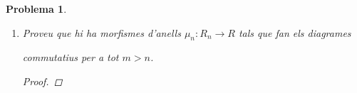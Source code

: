 \documentclass[compress]{article}
\newtheorem{problema}{Problema}
\theoremstyle{definition}
\begin{document}
\begin{problema}
\begin{enumerate}
\begin{proof}
            \begin{align*}
                &([(r,n)]+[(r',n')])\cdot[(r'',n'')]\\
                =\,
                &[(f_{nk}(r)+_{R_{k}}f_{n'k}(r'),k)]\cdot[(r'',n'')]
                &\quad&\textrm{(Per definició de $+$)}\\
                =\,
                &[((f_{kk'}(f_{nk}(r)+_{R_{k}}f_{n'k}(r')))\cdot_{R_{k'}}f_{n''k'}(r''),k')]
                &\quad&\textrm{(Per definició de $+$)}\\
                =\,
                &[((f_{nk'}(r)+_{R_{k'}}f_{n'k'}(r'))\cdot_{R_{k'}}f_{n''k'}(r''),k')]
                &\quad&\textrm{($f_{kk'}$ morf. d'anells i $f_{\alpha\gamma}=f_{\beta\gamma}\circ f_{\alpha\beta}$)}\\
                =\,
                &[((f_{nk'}(r)\cdot_{R_{k'}}f_{n''k'}(r''))+_{R_{k'}}(f_{n'k'}(r')\cdot_{R_{k'}}f_{n''k'}(r'')),k')]
                &\quad&\textrm{(Distributivitat de $\cdot_{R_{n}}$ sobre $+_{R_{n}}$)}\\
                =\,
                &[((f_{nk'}(r)\cdot_{R_{k'}}f_{n''k'}(r''),k')]
                +[((f_{n'k'}(r')\cdot_{R_{k'}}f_{n''k'}(r'')),k')]
                &\quad&\textrm{(Per definició de $+$)}\\
                =\,
                &([(r,n)]\cdot[(r'',n'')])
                +([(r',n')]\cdot[(r'',n'')])
                &\quad&\textrm{(Per definició de $\cdot$)}
            \end{align*}
            com volíem veure.\newline
            No diem res sobre l'existència de l'element neutre multiplicatiu ni de la commutativitat de $\cdot$ ja que $\{R_{n}\newline:n\in\mathbb{N}\}$ no és una família d'anells necessàriament commutatius i amb unitat.
        \end{proof}
        \item Proveu que hi ha morfismes d'anells $\mu_{n}:R_{n}\rightarrow R$ tals que fan els diagrames
        \begin{center}
        \end{center}
        commutatius per a tot $m>n$.
        \begin{proof}

\end{proof}
\end{enumerate}
\end{problema}
\end{document}
